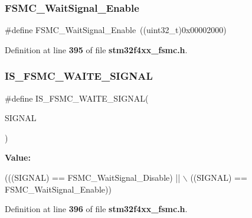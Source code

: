 \subsubsection{F\+S\+M\+C\+\_\+\+Wait\+Signal\+\_\+\+Enable}
{\footnotesize\ttfamily \#define F\+S\+M\+C\+\_\+\+Wait\+Signal\+\_\+\+Enable~((uint32\+\_\+t)0x00002000)}



Definition at line \textbf{ 395} of file \textbf{ stm32f4xx\+\_\+fsmc.\+h}.

\mbox{\label{group__FSMC__Wait__Signal_gae617db4f15c82850d4f5c927f9a7db3e}} 
\subsubsection{I\+S\+\_\+\+F\+S\+M\+C\+\_\+\+W\+A\+I\+T\+E\+\_\+\+S\+I\+G\+N\+AL}
{\footnotesize\ttfamily \#define I\+S\+\_\+\+F\+S\+M\+C\+\_\+\+W\+A\+I\+T\+E\+\_\+\+S\+I\+G\+N\+AL(\begin{DoxyParamCaption}\item[{}]{S\+I\+G\+N\+AL }\end{DoxyParamCaption})}

{\bfseries Value\+:}
\begin{DoxyCode}
(((SIGNAL) == FSMC_WaitSignal_Disable) || \(\backslash\)
                                      ((SIGNAL) == FSMC_WaitSignal_Enable))
\end{DoxyCode}


Definition at line \textbf{ 396} of file \textbf{ stm32f4xx\+\_\+fsmc.\+h}.

